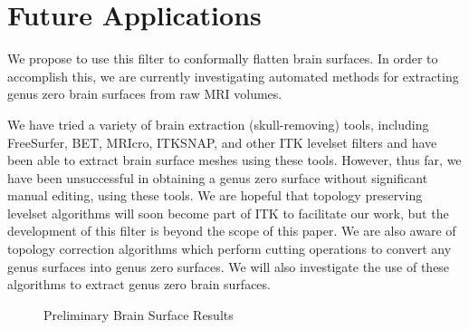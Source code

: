 \documentclass{InsightArticle}
\begin{document}
	\section{Future Applications}
  We propose to use this filter to conformally flatten brain
  surfaces. In order to accomplish this, we are currently
  investigating automated methods for extracting genus zero brain
  surfaces from raw MRI volumes.

  We have tried a variety of brain extraction (skull-removing) tools,
  including FreeSurfer, BET, MRIcro, ITKSNAP, and other ITK levelset
  filters and have been able to extract brain surface meshes using
  these tools. However, thus far, we have been unsuccessful in
  obtaining a genus zero surface without significant manual editing,
  using these tools. We are hopeful that topology preserving levelset
  algorithms will soon become part of ITK to facilitate our work, but
  the development of this filter is beyond the scope of this paper. We
  are also aware of topology correction algorithms which perform
  cutting operations to convert any genus surfaces into genus zero
  surfaces. We will also investigate the use of these algorithms to
  extract genus zero brain surfaces.

  \begin{figure}[h]
		\begin{center}
    \end{center}
    \vspace{-.25in} \caption{Preliminary Brain Surface Results}
  \end{figure}  
\end{document}
